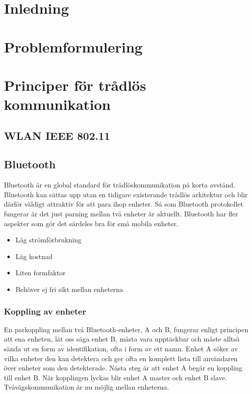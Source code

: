 \documentclass[a4paper,12pt,fleqn]{article}
\begin{document}
\addto\captionsswedish{\renewcommand{\contentsname}{Innehållsförteckning}}

\tableofcontents
\thispagestyle{fancy}
\newpage

\section{Inledning}
\section{Problemformulering}
\section{Principer för trådlös kommunikation}
\subsection{WLAN IEEE 802.11}
\subsection{Bluetooth}
Bluetooth är en global standard för trådlöskommunikation på korta avstånd. Bluetooth kan sättas upp utan en tidigare existerande trådlös arkitektur och blir därför väldigt attraktiv för att para ihop enheter. Så som Bluetooth protokollet fungerar är det just parning mellan två enheter är aktuellt. Bluetooth har fler aspekter som gör det särdeles bra för små mobila enheter. 
\begin{itemize}
\item Låg strömförbrukning 
\item Låg kostnad
\item Liten formfaktor
\item Behöver ej fri sikt mellan enheterna
\end{itemize}

\subsubsection{Koppling av enheter}
En parkoppling mellan två Bluetooth-enheter, A och B, fungerar enligt principen att ena enheten, låt oss säga enhet B, måsta vara upptäckbar och måste alltså sända ut en form av identifikation, ofta i form av ett namn. Enhet A söker av vilka enheter den kan detektera och ger ofta en komplett lista till användaren över enheter som den detekterade. Nästa steg är att enhet A begär en koppling till enhet B. När kopplingen lyckas blir enhet A master och enhet B slave. Tvåvägskommunikation är nu möjlig mellan enheterna.
\end{document}
